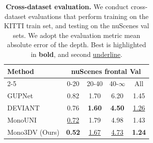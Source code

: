 \begin{table}[h!]
    \centering
    \caption{\textbf{Cross-dataset evaluation.} We conduct cross-dataset evaluations that perform training on the KITTI train set, and testing on the nuScenes val sets. We adopt the evaluation metric mean absolute error of the depth. Best is highlighted in \textbf{bold}, and second \underline{underline}.}
    \begin{tabular}{l|cccc}
        \hline
         \multirow{2}{*}{Method} & \multicolumn{4}{c}{nuScenes frontal Val} \\ \cline{2-5}
         & 0-20 & 20-40 & 40-$\infty$ & All \\ \hline \hline
         GUPNet~\cite{GUPNet} & 0.82 & 1.70 & 6.20 & 1.45 \\
         DEVIANT~\cite{DEVIANT} & 0.76 & \textbf{1.60} & \textbf{4.50} & \underline{1.26} \\
         MonoUNI~\cite{MonoUNI} & \underline{0.72} & 1.79 & 4.98 & 1.43 \\ \hline
         Mono3DV (Ours) & \textbf{0.52} & \underline{1.67} & \underline{4.73} & \textbf{1.24} \\ \hline
         
    \end{tabular}
    \label{tab:cross_dataset_eval}
\end{table}